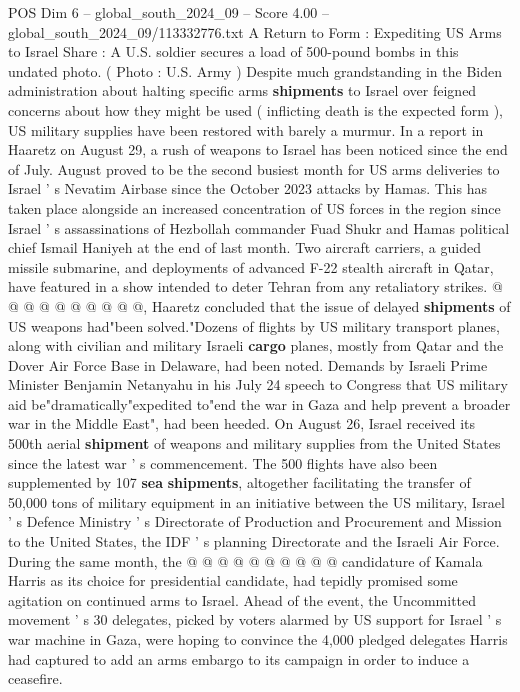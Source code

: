 \begin{textsample}{POS Dim 6 – global\_south\_2024\_09 – Score 4.00 – global\_south\_2024\_09/113332776.txt}  \label{ex:f6_pos_420}
A Return to Form : Expediting US Arms to Israel Share : A U.S. soldier secures a load of 500-pound bombs in this undated photo. ( Photo : U.S.
Army ) Despite much grandstanding in the Biden administration about halting specific arms \textbf{shipments} to Israel over feigned concerns about how they might be used ( inflicting death is the expected form ), US military supplies have been restored with barely a murmur.
In a report in Haaretz on August 29, a rush of weapons to Israel has been noticed since the end of July.
August proved to be the second busiest month for US arms deliveries to Israel ' s Nevatim Airbase since the October 2023 attacks by Hamas.
This has taken place alongside an increased concentration of US forces in the region since Israel ' s assassinations of Hezbollah commander Fuad Shukr and Hamas political chief Ismail Haniyeh at the end of last month.
Two aircraft carriers, a guided missile submarine, and deployments of advanced F-22 stealth aircraft in Qatar, have featured in a show intended to deter Tehran from any retaliatory strikes. @ @ @ @ @ @ @ @ @ @, Haaretz concluded that the issue of delayed \textbf{shipments} of US weapons had"been solved."Dozens of flights by US military transport planes, along with civilian and military Israeli \textbf{cargo} planes, mostly from Qatar and the Dover Air Force Base in Delaware, had been noted.
Demands by Israeli Prime Minister Benjamin Netanyahu in his July 24 speech to Congress that US military aid be"dramatically"expedited to"end the war in Gaza and help prevent a broader war in the Middle East", had been heeded.
On August 26, Israel received its 500th aerial \textbf{shipment} of weapons and military supplies from the United States since the latest war ' s commencement.
The 500 flights have also been supplemented by 107 \textbf{sea} \textbf{shipments}, altogether facilitating the transfer of 50,000 tons of military equipment in an initiative between the US military, Israel ' s Defence Ministry ' s Directorate of Production and Procurement and Mission to the United States, the IDF ' s planning Directorate and the Israeli Air Force.
During the same month, the @ @ @ @ @ @ @ @ @ @ candidature of Kamala Harris as its choice for presidential candidate, had tepidly promised some agitation on continued arms to Israel.
Ahead of the event, the Uncommitted movement ' s 30 delegates, picked by voters alarmed by US support for Israel ' s war machine in Gaza, were hoping to convince the 4,000 pledged delegates Harris had captured to add an arms embargo to its campaign in order to induce a ceasefire.

\end{textsample}
